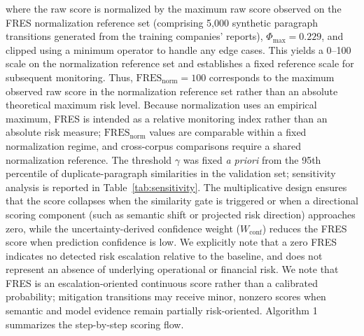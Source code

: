 \documentclass[journal]{IEEEtran}
\begin{document}
where the raw score is normalized by the maximum raw score observed on the FRES normalization reference set (comprising 5,000 synthetic paragraph transitions generated from the training companies' reports), $\Phi_{\text{max}} = 0.229$, and clipped using a minimum operator to handle any edge cases. This yields a 0--100 scale on the normalization reference set and establishes a fixed reference scale for subsequent monitoring. Thus, $\text{FRES}_{\text{norm}} = 100$ corresponds to the maximum observed raw score in the normalization reference set rather than an absolute theoretical maximum risk level. Because normalization uses an empirical maximum, FRES is intended as a relative monitoring index rather than an absolute risk measure; $\text{FRES}_{\text{norm}}$ values are comparable within a fixed normalization regime, and cross-corpus comparisons require a shared normalization reference. The threshold $\gamma$ was fixed \textit{a priori} from the 95th percentile of duplicate-paragraph similarities in the validation set; sensitivity analysis is reported in Table~\ref{tab:sensitivity}. The multiplicative design ensures that the score collapses when the similarity gate is triggered or when a directional scoring component (such as semantic shift or projected risk direction) approaches zero, while the uncertainty-derived confidence weight ($W_{\text{conf}}$) reduces the FRES score when prediction confidence is low. We explicitly note that a zero FRES indicates no detected risk escalation relative to the baseline, and does not represent an absence of underlying operational or financial risk. We note that FRES is an escalation-oriented continuous score rather than a calibrated probability; mitigation transitions may receive minor, nonzero scores when semantic and model evidence remain partially risk-oriented. Algorithm 1 summarizes the step-by-step scoring flow.
\end{document}
